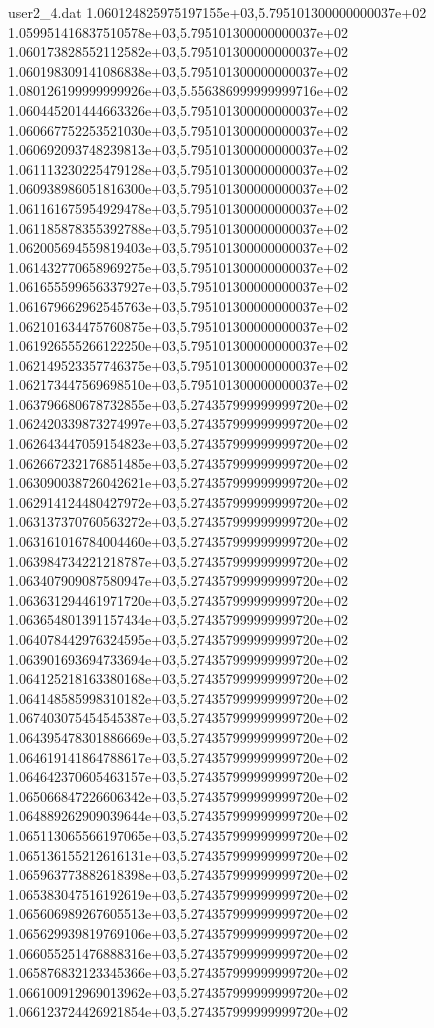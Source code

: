 \begin{filecontents}{user2_4.dat}
1.060124825975197155e+03,5.795101300000000037e+02
1.059951416837510578e+03,5.795101300000000037e+02
1.060173828552112582e+03,5.795101300000000037e+02
1.060198309141086838e+03,5.795101300000000037e+02
1.080126199999999926e+03,5.556386999999999716e+02
1.060445201444663326e+03,5.795101300000000037e+02
1.060667752253521030e+03,5.795101300000000037e+02
1.060692093748239813e+03,5.795101300000000037e+02
1.061113230225479128e+03,5.795101300000000037e+02
1.060938986051816300e+03,5.795101300000000037e+02
1.061161675954929478e+03,5.795101300000000037e+02
1.061185878355392788e+03,5.795101300000000037e+02
1.062005694559819403e+03,5.795101300000000037e+02
1.061432770658969275e+03,5.795101300000000037e+02
1.061655599656337927e+03,5.795101300000000037e+02
1.061679662962545763e+03,5.795101300000000037e+02
1.062101634475760875e+03,5.795101300000000037e+02
1.061926555266122250e+03,5.795101300000000037e+02
1.062149523357746375e+03,5.795101300000000037e+02
1.062173447569698510e+03,5.795101300000000037e+02
1.063796680678732855e+03,5.274357999999999720e+02
1.062420339873274997e+03,5.274357999999999720e+02
1.062643447059154823e+03,5.274357999999999720e+02
1.062667232176851485e+03,5.274357999999999720e+02
1.063090038726042621e+03,5.274357999999999720e+02
1.062914124480427972e+03,5.274357999999999720e+02
1.063137370760563272e+03,5.274357999999999720e+02
1.063161016784004460e+03,5.274357999999999720e+02
1.063984734221218787e+03,5.274357999999999720e+02
1.063407909087580947e+03,5.274357999999999720e+02
1.063631294461971720e+03,5.274357999999999720e+02
1.063654801391157434e+03,5.274357999999999720e+02
1.064078442976324595e+03,5.274357999999999720e+02
1.063901693694733694e+03,5.274357999999999720e+02
1.064125218163380168e+03,5.274357999999999720e+02
1.064148585998310182e+03,5.274357999999999720e+02
1.067403075454545387e+03,5.274357999999999720e+02
1.064395478301886669e+03,5.274357999999999720e+02
1.064619141864788617e+03,5.274357999999999720e+02
1.064642370605463157e+03,5.274357999999999720e+02
1.065066847226606342e+03,5.274357999999999720e+02
1.064889262909039644e+03,5.274357999999999720e+02
1.065113065566197065e+03,5.274357999999999720e+02
1.065136155212616131e+03,5.274357999999999720e+02
1.065963773882618398e+03,5.274357999999999720e+02
1.065383047516192619e+03,5.274357999999999720e+02
1.065606989267605513e+03,5.274357999999999720e+02
1.065629939819769106e+03,5.274357999999999720e+02
1.066055251476888316e+03,5.274357999999999720e+02
1.065876832123345366e+03,5.274357999999999720e+02
1.066100912969013962e+03,5.274357999999999720e+02
1.066123724426921854e+03,5.274357999999999720e+02

\end{filecontents}
